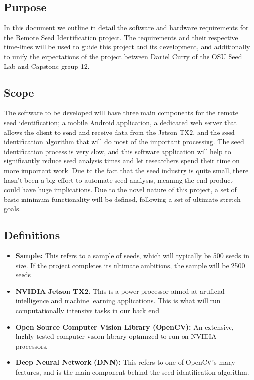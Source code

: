 \documentclass[onecolumn, draftclsnofoot,10pt, compsoc]{IEEEtran}
\begin{document}
\subsection{Purpose}
In this document we outline in detail the software and hardware requirements for the Remote Seed Identification project. The requirements and their respective time-lines will be used to guide this project and its development, and additionally to unify the expectations of the project between Daniel Curry of the OSU Seed Lab and Capstone group 12. 

\subsection{Scope}
The software to be developed will have three main components for the remote seed identification; a mobile Android application, a dedicated web server that allows the client to send and receive data from the Jetson TX2, and the seed identification algorithm that will do most of the important processing. The seed identification process is very slow, and this software application will help to significantly reduce seed analysis times and let researchers spend their time on more important work. Due to the fact that the seed industry is quite small, there hasn't been a big effort to automate seed analysis, meaning the end product could have huge implications. Due to the novel nature of this project, a set of basic minimum functionality will be defined, following a set of ultimate stretch goals.  
\subsection{Definitions}
\begin{itemize}
\item
\textbf{Sample: } This refers to a sample of seeds, which will typically be 500 seeds in size. If the project completes its ultimate ambitions, the sample will be 2500 seeds
\item
\textbf{NVIDIA Jetson TX2: } This is a power processor aimed at artificial intelligence and machine learning applications. This is what will run computationally intensive tasks in our back end
\item
\textbf{Open Source Computer Vision Library (OpenCV): } An extensive, highly tested computer vision library optimized to run on NVIDIA processors.
\item
\textbf{Deep Neural Network (DNN): } This refers to one of OpenCV's many features, and is the main component behind the seed identification algorithm.
\end{itemize}
\end{document}
